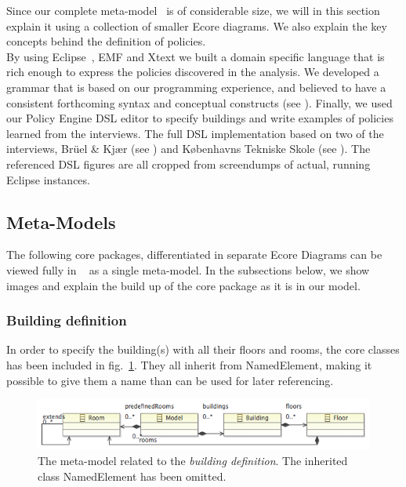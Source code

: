 Since our complete meta-model~\cite{ecore-complete} is of considerable size, we will in this section explain it using a collection of smaller Ecore diagrams. We also explain the key concepts behind the definition of policies.\\
 
By using Eclipse~\cite{eclipse}, EMF and Xtext we built a domain specific language that is rich enough to express the policies discovered in the analysis. We developed a grammar that is based on our programming experience, and believed to have a consistent forthcoming syntax and conceptual constructs (see ). Finally, we used our Policy Engine DSL editor to specify buildings and write examples of policies learned from the interviews. The full DSL implementation based on two of the interviews,  Br\"{u}el \& Kj\ae r (see ) and  K\o benhavns Tekniske Skole (see ). The referenced DSL figures are all cropped from screendumps of actual, running Eclipse instances.

\subsection{Meta-Models}

The following core packages, differentiated in separate Ecore Diagrams can be viewed fully in ~\cite{ecore-complete} as a single meta-model. In the subsections below, we show images and explain the build up of the core package as it is in our model. 

\subsubsection{Building definition}
In order to specify the building(s) with all their floors and rooms, the core classes has been included in fig. \ref{fig:ecore-building-definition}. They all inherit from NamedElement, making it possible to give them a name than can be used for later referencing.
\begin{figure}[h]
  \centering \includegraphics[scale=.5]{ecore-building-definition.png}  
	\caption{The meta-model related to the \textit{building definition}. The inherited class NamedElement has been omitted.}
	\label{fig:ecore-building-definition}
\end{figure}

